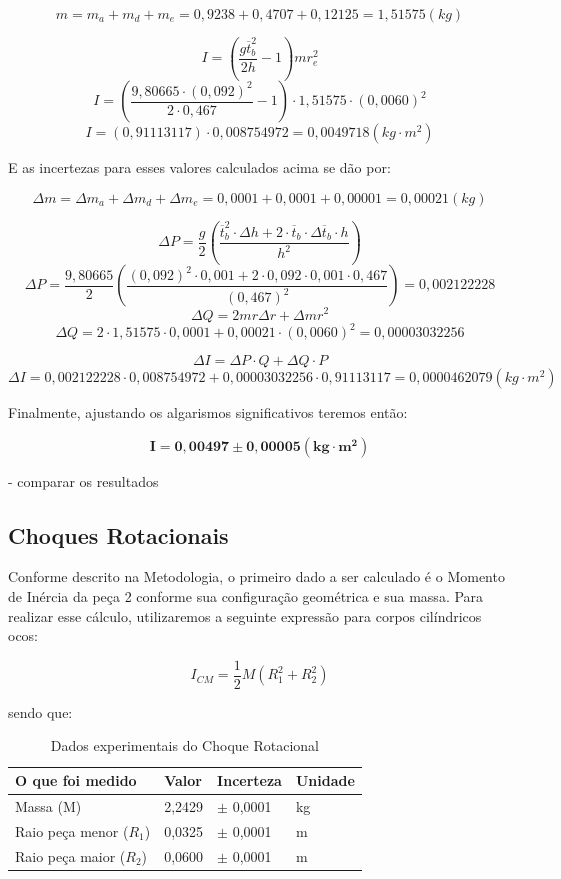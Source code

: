 \[m = m_a + m_d + m_e = 0,9238 + 0,4707 + 0,12125 = 1,51575 (kg)\]

\[I = \left( \frac{g \overline{t}_b^2}{2h} - 1 \right) m r_e^2\]
\[I = \left( \frac{9,80665 \cdot (0,092)^2}{2 \cdot 0,467} - 1 \right) \cdot 1,51575 \cdot (0,0060)^2\]
\[I = \left(0,91113117 \right) \cdot 0,008754972 = 0,0049718 (kg \cdot m^2)\]

E as incertezas para esses valores calculados acima se dão por:

\[\Delta m = \Delta m_a + \Delta m_d + \Delta m_e = 0,0001 + 0,0001 + 0,00001 = 0,00021 (kg)\]

\[
    \Delta P = \frac{g}{2} 
    \left( 
        \frac
        {\overline{t}_b^2 \cdot \Delta h + 2 \cdot \overline{t}_b \cdot \Delta \overline{t}_b \cdot h}
        {h^2} 
    \right)
\]
\[
    \Delta P = \frac{9,80665}{2} \left(\frac{(0,092)^2 \cdot 0,001 + 2 \cdot 0,092 \cdot 0,001 \cdot 0,467}{(0,467)^2} \right) = 0,002122228
\]
\[\Delta Q = 2mr \Delta r + \Delta m r^2\]
\[\Delta Q = 2 \cdot 1,51575 \cdot 0,0001 + 0,00021 \cdot (0,0060)^2 = 0,00003032256\]

\[\Delta I = \Delta P \cdot Q + \Delta Q \cdot P\]
\[\Delta I = 0,002122228 \cdot 0,008754972 + 0,00003032256 \cdot 0,91113117 = 0,0000462079 (kg \cdot m^2)\]

Finalmente, ajustando os algarismos significativos teremos então:

\[\mathbf{I = 0,00497 \pm 0,00005 (kg \cdot m^2)}\]

- comparar os resultados


\subsection{Choques Rotacionais}

Conforme descrito na Metodologia, o primeiro dado a ser calculado é o Momento de Inércia da peça 2 conforme sua configuração geométrica e sua massa. Para realizar esse cálculo, utilizaremos a seguinte expressão para corpos cilíndricos ocos:

\[I_{CM} = \frac {1}{2}M(R_1^2+R_2^2)\]

sendo que:\\

\begin{table}[H]
    \centering
    \begin{tabular}{ |p{4.3cm}||p{1.7cm}||p{2cm}||p{2cm}|  }
        \hline
        \textbf{O que foi medido} & \textbf{Valor} & \textbf{Incerteza} & \textbf{Unidade}\\
        \hline
        Massa (M)               & 2,2429    & $\pm$ 0,0001  & kg\\
        Raio peça menor ($R_1$) & 0,0325    & $\pm$ 0,0001  & m\\
        Raio peça maior ($R_2$) & 0,0600    & $\pm$ 0,0001  & m\\
        \hline
    \end{tabular}
    \caption{Dados experimentais do Choque Rotacional}
\end{table}

